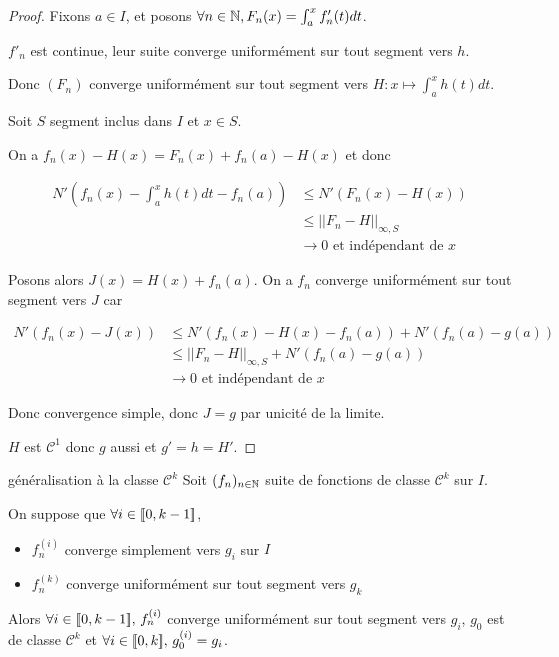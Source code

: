 
\begin{proof}
    Fixons $a \in I$, et posons $\forall n \in \mathbb{N}, F_n(x) = \int_{a}^{x } f_n'(t) dt$.

    $f'_n$ est continue, leur suite converge uniformément sur tout segment vers $h$. 

    Donc $(F_n)$ converge uniformément sur tout segment vers $H : x \mapsto \int_a^x h(t) dt$.

    \avspace Soit $S$ segment inclus dans $I$ et $x \in S$. 
    
    On a 
    $f_n(x) - H(x) = F_n(x) + f_n(a) - H(x)$ et donc 

    \begin{align}
        N'(f_n(x) - \int_{a }^{x } h(t) dt - f_n(a)) & \leqslant N'(F_n(x) - H(x)) \\
        & \leqslant ||F_n - H||_{\infty, S} \\
        & \to 0 \text{ et indépendant de } x
    \end{align}

    Posons alors $J(x) = H(x) + f_n(a)$. On a $f_n$ converge uniformément sur tout segment vers 
    $J$ car  
    
    \begin{align}
        N'(f_n(x) - J(x)) & \leqslant N'(f_n(x) - H(x) - f_n(a)) + N'(f_n(a) - g(a)) \\
        & \leqslant ||F_n - H||_{\infty, S} + N'(f_n(a) - g(a)) \\
        & \to 0 \text{ et indépendant de } x
    \end{align}

    Donc convergence simple, donc $J = g$ par unicité de la limite. 

    $H$ est $\mathscr {C}^1$ donc $g$ aussi et $g' = h = H'$.
\end{proof}

\begin{theoreme}{généralisation à la classe $\mathscr{C}^k$}{}
    Soit $(f_n)_{n \in \mathbb{N}}$ suite de fonctions de classe $\mathscr{C}^k$ sur $I$. 

    On suppose que  $\forall i \in [\![0, k - 1]\!]$, 
    \begin{itemize}
        \item $f_n^{(i)}$ converge simplement vers $g_i$ sur $I$
        \item $f_n^{(k)}$ converge uniformément sur tout segment vers $g_k$
    \end{itemize}

    Alors $\forall i \in [\![0, k - 1]\!], \, f_n^{(i)}$ converge uniformément sur tout segment vers $g_i$,
    $g_0$ est de classe $\mathscr{C}^k$ et $\forall i \in [\![0, k]\!], \, g_0^{(i)} = g_i$.
\end{theoreme}

